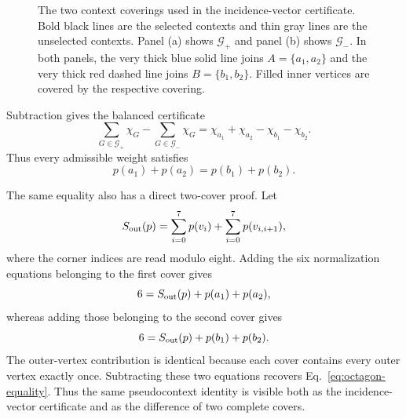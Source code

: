\documentclass[
  twocolumn,
  aps,
  pra,
  floatfix,
  amsmath,amssymb,
  longbibliography
]{revtex4-2}
\theoremstyle{definition}
\theoremstyle{remark}
\begin{document}
\begin{figure}[t]
\caption{The two context coverings used in the incidence-vector certificate.
Bold black lines are the selected contexts and thin gray lines are the
unselected contexts.  Panel (a) shows $\mathcal G_+$ and panel (b) shows
$\mathcal G_-$.  In both panels, the very thick blue solid line joins
$A=\{a_1,a_2\}$ and the very thick red dashed line joins $B=\{b_1,b_2\}$.  Filled
inner vertices are covered by the respective covering.}
\label{fig:octagon}
\end{figure}

Subtraction gives the balanced certificate
\begin{equation}
 \sum_{G\in\mathcal G_+}\chi_G-
 \sum_{G\in\mathcal G_-}\chi_G
 =\chi_{a_1}+\chi_{a_2}-\chi_{b_1}-\chi_{b_2}.
 \label{eq:octagon-certificate}
\end{equation}
Thus every admissible weight satisfies
\begin{equation}
 p(a_1)+p(a_2)=p(b_1)+p(b_2).
 \label{eq:octagon-equality}
\end{equation}

The same equality also has a direct two-cover proof.  Let
\begin{equation*}
 S_{\rm out}(p)=\sum_{i=0}^{7}p(v_i)+
 \sum_{i=0}^{7}p(v_{i,i+1}),
\end{equation*}
where the corner indices are read modulo eight.  Adding the six
normalization equations belonging to the first cover gives
\begin{equation}
 6=S_{\rm out}(p)+p(a_1)+p(a_2),
 \label{eq:octagon-cover-plus}
\end{equation}
whereas adding those belonging to the second cover gives
\begin{equation}
 6=S_{\rm out}(p)+p(b_1)+p(b_2).
 \label{eq:octagon-cover-minus}
\end{equation}
The outer-vertex contribution is identical because each cover contains every
outer vertex exactly once.  Subtracting these two equations recovers
Eq.~\eqref{eq:octagon-equality}.  Thus the same pseudocontext identity is
visible both as the incidence-vector certificate and as the difference of two
complete covers.
\end{document}
